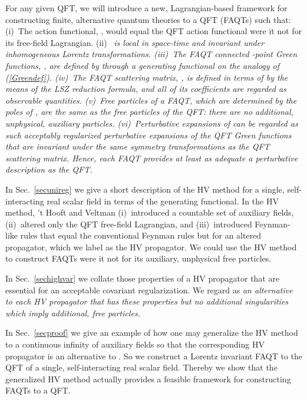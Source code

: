 \documentclass[a4paper,12pt]{article}
\providecommand{\akcija}{I}
\providecommand{\akcijaA}{\akcija_A}
\providecommand{\prop}{\widetilde{\Delta}}
\providecommand{\propF}{\prop_F}
\providecommand{\Gf}{G^{(n)}}
\providecommand{\GfA}{\Gf_A}
\providecommand{\SmA}{S_A}
\begin{document}
For any given QFT, we will introduce a new, Lagrangian-based framework for constructing finite, alternative quantum theories to a QFT (FAQTs) such that: (i)~The action functional, \myHighlight{$\akcijaA$}\coordHE{}, would equal the QFT action functional were it not for its free-field Lagrangian. (ii)~\myHighlight{$\akcijaA$}\coordHE{} \it is local in space-time and invariant under inhomogeneous Lorentz transformations. \rm (iii)~The FAQT connected \coordHE{}-point Green functions, \myHighlight{$\GfA$}\coordHE{}, are defined by \myHighlight{$\akcijaA$}\coordHE{} through a generating functional on the analogy of (\ref{Greendef}). (iv)~The FAQT scattering matrix, \myHighlight{$\SmA$}\coordHE{}, is defined in terms of \myHighlight{$\GfA$}\coordHE{} by the means of the LSZ reduction formula, and \it all of its coefficients are regarded as observable quantities. \rm (v)~Free particles of a FAQT, which are determined by the poles of \coordHE{}, are \it the same \rm as the free particles of the QFT: there are no additional, unphysical, auxiliary particles. (vi)~Perturbative expansions of \myHighlight{$\GfA$}\coordHE{} can be regarded as such acceptably regularized perturbative expansions of the QFT Green functions that are \it invariant under the same symmetry transformations as the QFT scattering matrix. \rm Hence, each FAQT provides at least as adequate a perturbative description as the QFT.

In Sec.~\ref{secunireg} we give a short description of the HV method for a single, self-interacting real scalar field in terms of the generating functional. In the HV method,  't Hooft and Veltman (i)~introduced a countable set of auxiliary fields, (ii)~altered only the QFT free-field Lagrangian, and (iii)~introduced Feynman-like rules that equal the conventional Feynman rules but for an altered propagator, which we label as the HV propagator. We could use the HV method to construct FAQTs were it not for its auxiliary, unphysical free particles.

In Sec.~\ref{sechighvar} we collate those properties of a HV propagator that are essential for an acceptable covariant regularization. We regard as \it an alternative \rm to \myHighlight{$\propF$}\coordHE{} each HV propagator that has these properties but no additional singularities which imply additional, free particles.

In Sec.~\ref{secproof} we give an example of how one may generalize the HV method to a continuous infinity of auxiliary fields so that the corresponding HV propagator is an alternative to \myHighlight{$\propF$}\coordHE{}. So we construct a Lorentz invariant FAQT to the QFT of a single, self-interacting real scalar field. Thereby we show that the generalized HV method actually provides a feasible framework for constructing FAQTs to a QFT.
\end{document}
